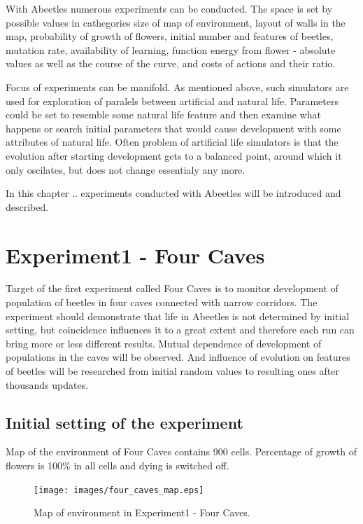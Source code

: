 \documentclass[a4paper,12pt]{report}
\begin{document}
With Abeetles numerous experiments can be conducted. The space is set by possible values in cathegories size of map of environment, layout of walls in the map, probability of growth of flowers, initial	number and features of beetles,	mutation rate, availability of learning, function energy from flower - absolute values	as well as the course of the curve, and costs of actions and their ratio.

Focus of experiments can be manifold. As mentioned above, such simulators are used for exploration of paralels between artificial and natural life. Parameters could be set to resemble some natural life feature and then examine what happens or search initial parameters that would cause development with some attributes of natural life. Often problem of artificial life simulators is that the evolution after starting development gets to a balanced point, around which it only oscilates, but does not change essentialy any more. %

In this chapter .. experiments conducted with Abeetles will be introduced and described.

\section{Experiment1 - Four Caves}

Target of the first experiment called Four Caves is to monitor development of population of beetles in four caves connected with narrow corridors. The experiment should demonstrate that life in Abeetles is not determined by initial setting, but coincidence influences it to a great extent and therefore each run can bring more or less different results. Mutual dependence of development of populations in the caves will be observed. And influence of evolution on features of beetles will be researched from initial random values to resulting ones after thousands updates. 

\subsection{Initial setting of the experiment}
Map of the environment of Four Caves contains 900 cells. Percentage of growth of flowers is 100\% in all cells and dying is switched off. 

\begin{figure}
\begin{center}
  \texttt{[image: images/four\_caves\_map.eps]}
  \caption{Map of environment in Experiment1 - Four Caves.}
  \label{img.four_caves_map}
\end{center}
\end{figure}
\end{document}
